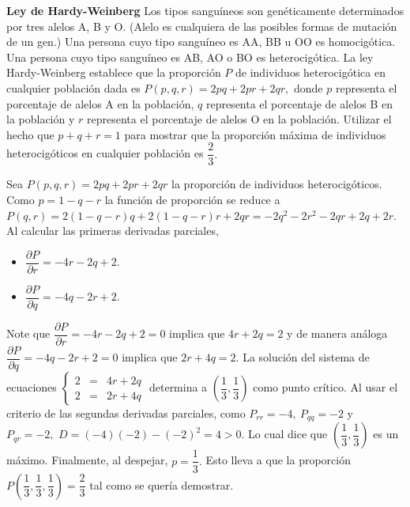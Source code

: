 \begin{prob}
\textbf{Ley de Hardy-Weinberg} Los tipos sanguíneos son genéticamente determinados por tres alelos A, B y O. (Alelo es cualquiera de las posibles formas de mutación de un gen.) Una persona cuyo tipo sanguíneo es AA, BB u OO es homocigótica. Una persona cuyo tipo sanguíneo es AB, AO o BO es heterocigótica. La ley Hardy-Weinberg establece que la proporción $P$ de individuos heterocigótica en cualquier población dada es $P(p,q,r)=2pq+2pr+2qr,$  donde $p$ representa el porcentaje de alelos A en la población, $q$ representa el porcentaje de alelos B en la población y $r$ representa el porcentaje de alelos O en la población. Utilizar el hecho que $p+q+r=1$ para mostrar que la proporción máxima de individuos heterocigóticos en cualquier población es $\dfrac{2}{3}.$
\begin{myproof}
Sea $P(p,q,r)=2pq+2pr+2qr$ la proporción de individuos heterocigóticos. Como $p=1-q-r$ la función de proporción se reduce a $P(q,r)=2(1-q-r)q+2(1-q-r)r+2qr=-2q^2-2r^2-2qr+2q+2r.$ 
Al calcular las primeras derivadas parciales,
\begin{itemize}
\item $\dfrac{\partial P}{\partial r}=-4r-2q+2.$
\item $\dfrac{\partial P}{\partial q}=-4q-2r+2.$
\end{itemize}
Note que $\dfrac{\partial P}{\partial r}=-4r-2q+2=0$ implica que $4r+2q=2$ y de manera análoga $\dfrac{\partial P}{\partial q}=-4q-2r+2=0$ implica que $2r+4q=2.$
La solución del sistema de ecuaciones $\left\lbrace \begin{array}{ccc} 2&=&4r+2q\\
2&=&2r+4q \end{array} \right.$ determina a $\left(\dfrac{1}{3},\dfrac{1}{3}\right)$ como punto crítico.
Al usar el criterio de las segundas derivadas parciales, como $P_{rr}=-4,\ P_{qq}=-2$ y $P_{qr}=-2,$ $D=\left(-4\right)\left(-2\right)-\left( -2 \right)^{2}=4>0.$ Lo cual dice que $\left( \dfrac{1}{3},\dfrac{1}{3} \right)$ es un máximo.
Finalmente, al despejar,  $p= \dfrac{1}{3}.$ Esto lleva a que la proporción  $P\left(\dfrac{1}{3},\dfrac{1}{3},\dfrac{1}{3}  \right)=\dfrac{2}{3}$ tal como se quería demostrar.
\end{myproof}
\end{prob}

